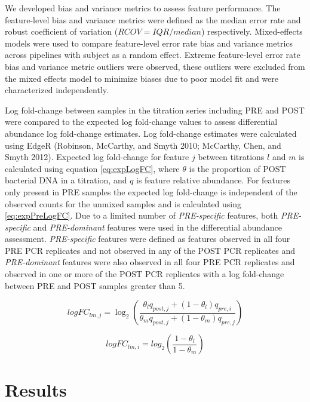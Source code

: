 \documentclass[smallextended]{svjour3}       %
\begin{document}
We developed bias and variance metrics to assess feature performance.
The feature-level bias and variance metrics were defined as the median
error rate and robust coefficient of variation (\(RCOV=IQR/median\))
respectively. Mixed-effects models were used to compare feature-level
error rate bias and variance metrics across pipelines with subject as a
random effect. Extreme feature-level error rate bias and variance metric
outliers were observed, these outliers were excluded from the mixed
effects model to minimize biases due to poor model fit and were
characterized independently.

Log fold-change between samples in the titration series including PRE
and POST were compared to the expected log fold-change values to assess
differential abundance log fold-change estimates. Log fold-change
estimates were calculated using EdgeR (Robinson, McCarthy, and Smyth
2010; McCarthy, Chen, and Smyth 2012). Expected log fold-change for
feature \(j\) between titrations \(l\) and \(m\) is calculated using
equation \eqref{eq:expLogFC}, where \(\theta\) is the proportion of POST
bacterial DNA in a titration, and \(q\) is feature relative abundance.
For features only present in PRE samples the expected log fold-change is
independent of the observed counts for the unmixed samples and is
calculated using \eqref{eq:expPreLogFC}. Due to a limited number of
\emph{PRE-specific} features, both \emph{PRE-specific} and
\emph{PRE-dominant} features were used in the differential abundance
assessment. \emph{PRE-specific} features were defined as features
observed in all four PRE PCR replicates and not observed in any of the
POST PCR replicates and \emph{PRE-dominant} features were also observed
in all four PRE PCR replicates and observed in one or more of the POST
PCR replicates with a log fold-change between PRE and POST samples
greater than 5.

\begin{equation}
      logFC_{lm,j} = \log_2\left(\frac{\theta_l q_{post,j} + (1 - \theta_l) q_{pre,i}}{\theta_m q_{post,j} + (1 - \theta_m) q_{pre,j}}\right)
  \label{eq:expLogFC}
\end{equation}

\begin{equation}
      logFC_{lm,i} = log_2\left(\frac{1-\theta_l}{1-\theta_m}\right)
  \label{eq:expPreLogFC}
\end{equation}

\hypertarget{results}{%
\section{Results}\label{results}}
\end{document}
